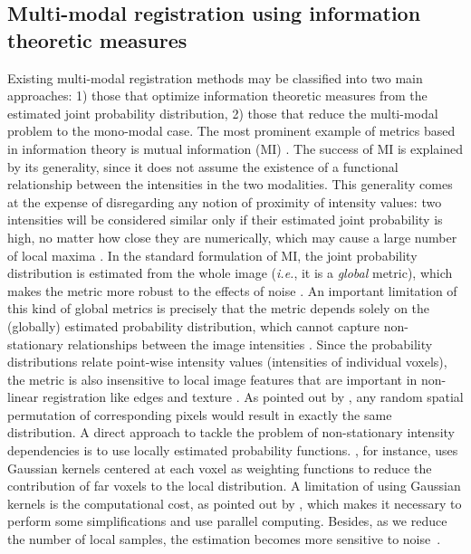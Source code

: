\subsection{Multi-modal registration using information theoretic measures}
Existing multi-modal registration methods may be classified into two main approaches: 1) those that optimize information theoretic measures from the estimated joint probability distribution, 2) those that reduce the multi-modal problem to the mono-modal case. The most prominent example of metrics based in information theory is mutual information (MI) \citep{Maes1997, Mattes2003}. The success of MI is explained by its generality, since it does not assume the existence of a functional relationship between the intensities in the two modalities. This generality comes at the expense of disregarding any notion of proximity of intensity values: two intensities will be considered similar only if their estimated joint probability is high, no matter how close they are numerically, which may cause a large number of local maxima \citep[see][Fig. 2]{Roche1998}. In the standard formulation of MI, the joint probability distribution is estimated from the whole image ({\it i.e.}, it is a {\it global} metric), which makes the metric more robust to the effects of noise \citep{Mattes2003}. An important limitation of this kind of global metrics is precisely that the metric depends solely on the (globally) estimated probability distribution, which cannot capture non-stationary relationships between the image intensities \citep{Hermosillo2004}. Since the probability distributions relate point-wise intensity values (intensities of individual voxels), the metric is also insensitive to local image features that are important in non-linear registration like edges and texture \citep{Heinrich2012}. As pointed out by \cite{Sotiras2013}, any random spatial permutation of corresponding pixels would result in exactly the same distribution. A direct approach to tackle the problem of non-stationary intensity dependencies is to use locally estimated probability functions. \cite{Hermosillo2004}, for instance, uses Gaussian kernels centered at each voxel as weighting functions to reduce the contribution of far voxels to the local distribution. A limitation of using Gaussian kernels is the computational cost, as pointed out by \cite{Hermosillo2004}, which makes it necessary to perform some simplifications and use parallel computing. Besides, as we reduce the number of local samples, the estimation becomes more sensitive to noise~\citep{Mattes2003}.

